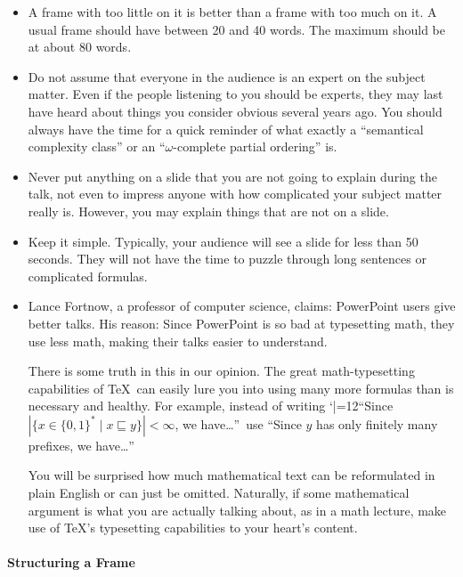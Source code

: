 \begin{itemize}
\item
  A frame with too little on it is better than a frame with too much on it. A usual frame should have between 20 and 40 words. The maximum should be at about 80 words.
\item
  Do not assume that everyone in the audience is an expert on the subject matter. Even if the people listening to you should be experts, they may last have heard about things you consider obvious several years ago. You should always have the time for a quick reminder of what exactly a ``semantical complexity class'' or an ``$\omega$-complete partial ordering'' is.
\item
  Never put anything on a slide that you are not going to explain during the talk, not even to impress anyone with how complicated your subject matter really is. However, you may explain things that are not on a slide.
\item
  Keep it simple. Typically, your audience will see a slide for less than 50 seconds. They will not have the time to puzzle through long sentences or complicated formulas.
\item
  Lance Fortnow, a professor of computer science, claims: PowerPoint users give better talks. His reason: Since PowerPoint is so bad at typesetting math, they use less math, making their talks easier to understand.

  There is some truth in this in our opinion. The great math-typesetting capabilities of \TeX\ can easily lure you into using many more formulas than is necessary and healthy. For example, instead of writing {\catcode `|=12``Since $\left|\{x \in \{0,1\}^* \mid x \sqsubseteq y\}\right| < \infty$}, we have\dots''\ use ``Since $y$ has only finitely many prefixes, we have\dots''

  You will be surprised how much mathematical text can be reformulated in plain English or can just be omitted. Naturally, if some mathematical argument is what you are actually talking about, as in a math lecture, make use of \TeX's typesetting capabilities to your heart's content.
\end{itemize}

\paragraph{Structuring a Frame}

